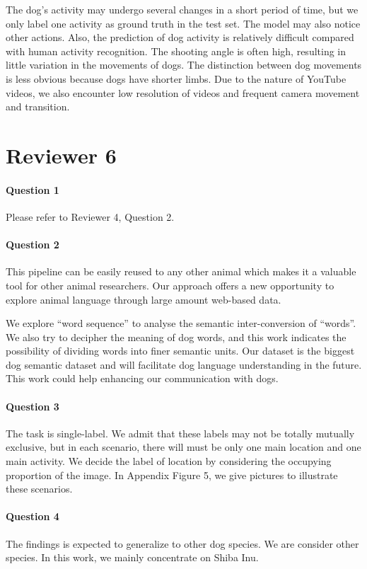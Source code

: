\documentclass[letterpaper]{article}
\newcommand{\MY}[1]{\textcolor{orange}{(Mengyue: #1)}}
\begin{document}
The dog's activity may undergo several changes in a short period of time, but we only label one activity as ground truth in the test set. The model may also notice other actions. Also, the prediction of dog activity is relatively difficult compared with human activity recognition. The shooting angle is often high, resulting in little variation in the movements of dogs. The distinction between dog movements is less obvious because dogs have shorter limbs. Due to the nature of YouTube videos, we also encounter low resolution of videos and frequent camera movement and transition. 


\section{Reviewer 6}

\paragraph{Question 1}
Please refer to Reviewer 4, Question 2. 

\paragraph{Question 2}
This pipeline can be easily reused to any other animal which makes it a valuable tool for other animal researchers. Our approach offers a new opportunity to explore animal language through large amount web-based data.

We explore ``word sequence'' to analyse the semantic inter-conversion of ``words''. 
We also try to decipher the meaning of dog words, and this work indicates the possibility of dividing words into finer semantic units. 
Our dataset is the biggest dog semantic dataset and will facilitate dog language understanding in the future. 
This work could help enhancing our communication with dogs.

\paragraph{Question 3}
The task is single-label. We admit that these labels may not be totally mutually exclusive, but in each scenario, there will must be only one main location and one main activity. We decide the label of location by considering the occupying proportion of the image. In Appendix Figure 5, we give pictures to illustrate these scenarios. 

\paragraph{Question 4} %
The findings is expected to generalize to other dog species. We are consider other species. In this work, we mainly concentrate on Shiba Inu. 



\end{document}
